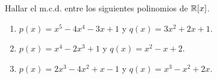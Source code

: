 \item Hallar el m.c.d. entre los siguientes polinomios de $\mathbb{R}[x]$.
    \begin{enumerate}
        \item $p(x)=x^5-4x^4-3x+1$ y $q(x)=3x^2+2x+1$.
            \begin{mdframed}[style=s]
                
            \end{mdframed}
        \item $p(x)=x^4-2x^3+1$ y $q(x)=x^2-x+2$.
            \begin{mdframed}[style=s]
                
            \end{mdframed}
        \item $p(x)=2x^3-4x^2+x-1$ y $q(x)=x^3-x^2+2x$.
            \begin{mdframed}[style=s]
                
            \end{mdframed}
    \end{enumerate}